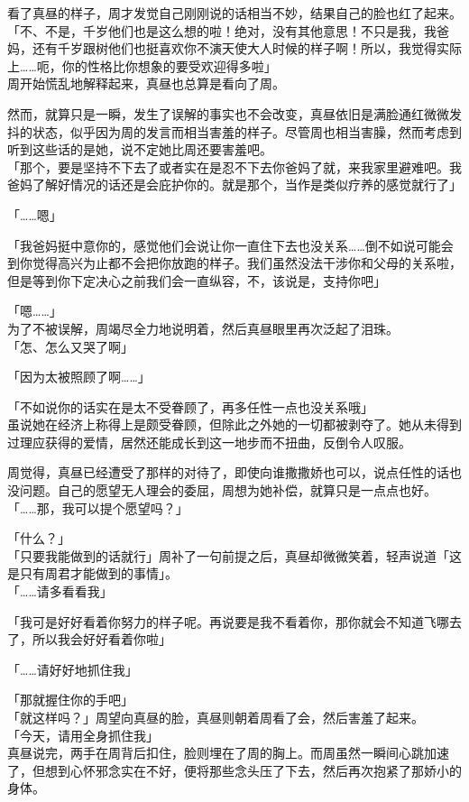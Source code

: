 看了真昼的样子，周才发觉自己刚刚说的话相当不妙，结果自己的脸也红了起来。\\

「不、不是，千岁他们也是这么想的啦！绝对，没有其他意思！不只是我，我爸妈，还有千岁跟树他们也挺喜欢你不演天使大人时候的样子啊！所以，我觉得实际上……呃，你的性格比你想象的要受欢迎得多啦」\\

周开始慌乱地解释起来，真昼也总算是看向了周。

然而，就算只是一瞬，发生了误解的事实也不会改变，真昼依旧是满脸通红微微发抖的状态，似乎因为周的发言而相当害羞的样子。尽管周也相当害臊，然而考虑到听到这些话的是她，说不定她比周还要害羞吧。\\

「那个，要是坚持不下去了或者实在是忍不下去你爸妈了就，来我家里避难吧。我爸妈了解好情况的话还是会庇护你的。就是那个，当作是类似疗养的感觉就行了」

「……嗯」

「我爸妈挺中意你的，感觉他们会说让你一直住下去也没关系……倒不如说可能会到你觉得高兴为止都不会把你放跑的样子。我们虽然没法干涉你和父母的关系啦，但是等到你下定决心之前我们会一直纵容，不，该说是，支持你吧」

「嗯……」\\

为了不被误解，周竭尽全力地说明着，然后真昼眼里再次泛起了泪珠。\\

「怎、怎么又哭了啊」

「因为太被照顾了啊……」

「不如说你的话实在是太不受眷顾了，再多任性一点也没关系哦」\\

虽说她在经济上称得上是颇受眷顾，但除此之外她的一切都被剥夺了。她从未得到过理应获得的爱情，居然还能成长到这一地步而不扭曲，反倒令人叹服。

周觉得，真昼已经遭受了那样的对待了，即使向谁撒撒娇也可以，说点任性的话也没问题。自己的愿望无人理会的委屈，周想为她补偿，就算只是一点点也好。\\

「……那，我可以提个愿望吗？」

「什么？」\\

「只要我能做到的话就行」周补了一句前提之后，真昼却微微笑着，轻声说道「这是只有周君才能做到的事情」。\\

「……请多看看我」

「我可是好好看着你努力的样子呢。再说要是我不看着你，那你就会不知道飞哪去了，所以我会好好看着你啦」

「……请好好地抓住我」

「那就握住你的手吧」\\

「就这样吗？」周望向真昼的脸，真昼则朝着周看了会，然后害羞了起来。\\

「今天，请用全身抓住我」\\

真昼说完，两手在周背后扣住，脸则埋在了周的胸上。而周虽然一瞬间心跳加速了，但想到心怀邪念实在不好，便将那些念头压了下去，然后再次抱紧了那娇小的身体。
